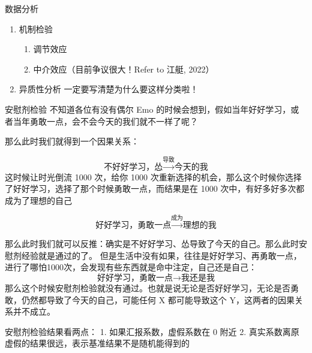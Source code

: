 \documentclass[
  ignorenonframetext,
  aspectratio=169,
  fontset=ubuntu]{ctexbeamer}
\providecommand{\tightlist}{%
  \setlength{\itemsep}{0pt}\setlength{\parskip}{0pt}}
\begin{document}
\begin{frame}[fragile]{数据分析}
\begin{enumerate}
  \begin{enumerate}
  \tightlist
  \item
    工具变量法（用好很难）
  \item
    PSM
  \item
    安慰剂检验
  \item
    Heckman 二阶段
  \item
    断点回归 RDD
  \item
    广义矩估计
  \item
    DID
  \item
    熵平衡法检验（Hainmueller J, 2012）
  \end{enumerate}
\item
  机制检验

  \begin{enumerate}
  \tightlist
  \item
    调节效应
  \item
    中介效应（目前争议很大！Refer to 江艇, 2022）
  \end{enumerate}
\item
  异质性分析 一定要写清楚为什么要这样分类啦！
\end{enumerate}
\end{frame}

\begin{frame}[fragile]{安慰剂检验}
\label{ux5b89ux6170ux5242ux68c0ux9a8c}
不知道各位有没有偶尔 Emo
的时候会想到，假如当年好好学习，或者当年勇敢一点，会不会今天的我们就不一样了呢？

那么此时我们就得到一个因果关系：

\[\text{不好好学习，怂} \xrightarrow{\text{导致}} \text{今天的我}\]
这时候让时光倒流 1000 次，给你 1000
次重新选择的机会，那么这个时候你选择了好好学习，选择了那个时候勇敢一点，而结果是在
1000 次中，有好多好多次都成为了理想的自己

\[\text{好好学习，勇敢一点} \xrightarrow{\text{成为}} \text{理想的我}\]

那么此时我们就可以反推：确实是不好好学习、怂导致了今天的自己。那么此时安慰剂经验就是通过的了。
但是生活中没有如果，往往是好好学习、再勇敢一点，进行了哪怕1000次，会发现有些东西就是命中注定，自己还是自己：
\[\text{好好学习，勇敢一点} \xrightarrow{\text{}} \text{我还是我}\]
那么这个时候安慰剂检验就没有通过。也就是说无论是否好好学习，无论是否勇敢，仍然都导致了今天的自己，可能任何
X 都可能导致这个 Y，这两者的因果关系并不成立。

安慰剂检验结果看两点： 1. 如果汇报系数，虚假系数在 0 附近 2.
真实系数离原虚假的结果很远，表示基准结果不是随机能得到的
\end{frame}
\end{document}
